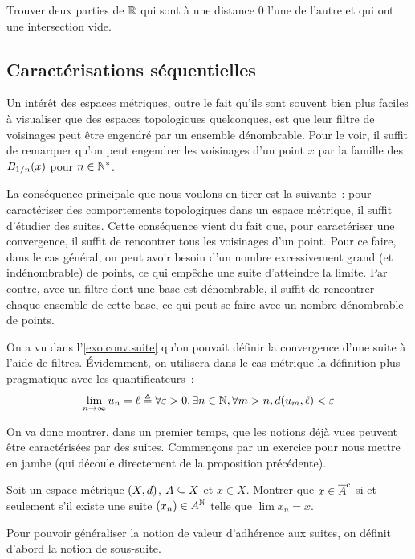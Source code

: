 \begin{exercise}
  Trouver deux parties de $\bR$ qui sont à une distance $0$ l'une de
  l'autre et qui ont une intersection vide.
\end{exercise}

\subsection{Caractérisations séquentielles}

Un intérêt des espaces métriques, outre le fait qu'ils sont souvent bien plus
faciles à visualiser que des espaces topologiques quelconques, est que leur
filtre de voisinages peut être engendré par un ensemble dénombrable. Pour le
voir, il suffit de remarquer qu'on peut engendrer les voisinages d'un point
$x$ par la famille des $\boule{x}{1/n}$ pour $n \in \bN^*$.

La conséquence principale que nous voulons en tirer est la suivante~: pour
caractériser des comportements topologiques dans un espace métrique, il suffit
d'étudier des suites. Cette conséquence vient du fait que, pour caractériser une
convergence, il suffit de rencontrer tous les voisinages d'un point. Pour ce
faire, dans le cas général, on peut avoir besoin d'un nombre excessivement grand
(et indénombrable) de points, ce qui empêche une suite d'atteindre la limite.
Par contre, avec un filtre dont une base est dénombrable, il suffit de
rencontrer chaque ensemble de cette base, ce qui peut se faire avec un nombre
dénombrable de points.

On a vu dans l'\cref{exo.conv.suite} qu'on pouvait définir la convergence
d'une suite à l'aide de filtres. \'Evidemment, on utilisera dans le cas
métrique la définition plus pragmatique avec les quantificateurs~:
\[\lim_{n \to \infty} u_n = \ell \defeq \forall \vareps > 0,
\exists n \in \bN, \forall m > n, \vardis(u_m,\ell) < \vareps\]

On va donc montrer, dans un premier temps, que les notions déjà vues peuvent
être caractérisées par des suites. Commençons par un exercice pour nous mettre
en jambe (qui découle directement de la proposition précédente).

\begin{exercise}
  Soit un espace métrique $(X,\vardis)$, $\varPt\subseteq X$ et $x\in X$.
  Montrer que $x\in \adher{\varPt}$ si et seulement s'il existe une suite
  $(x_n)\in \varPt^{\bN}$ telle que $\lim x_n = x$.
\end{exercise}

\noindent
Pour pouvoir généraliser la notion de valeur d'adhérence aux suites, on définit
d'abord la notion de sous-suite.

